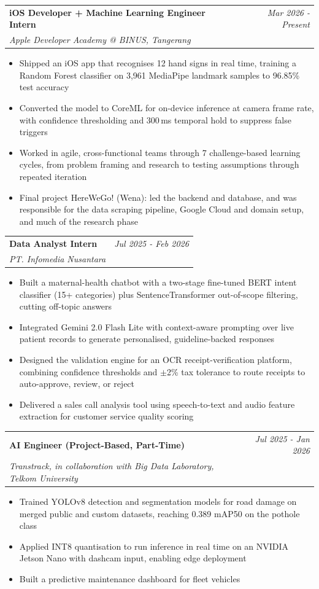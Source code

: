 \documentclass[a4paper,11pt]{article}
\makeatletter
\newcommand{\resumeSubheading}[4]{
\vspace{0.5mm}\item
    \begin{tabular*}{0.98\textwidth}[t]{l@{\extracolsep{\fill}}r}
        \textbf{#1} & \textit{\footnotesize{#4}} \\
        \textit{\footnotesize{#3}} &  \footnotesize{#2}\\
    \end{tabular*}
    \vspace{-2.4mm}
}
\newcommand{\resumeItemListStart}{\begin{justify}\begin{itemize}[leftmargin=3ex, rightmargin=2ex, noitemsep,labelsep=1.2mm,itemsep=0mm]\small}
\newcommand{\resumeItemListEnd}{\end{itemize}\end{justify}\vspace{-2mm}}
\makeatother
\begin{document}
    \resumeSubheading
      {iOS Developer + Machine Learning Engineer Intern}{}
      {Apple Developer Academy @ BINUS, Tangerang}{Mar 2026 - Present}
      \vspace{-2.0mm}
      \resumeItemListStart
        \item {Shipped an iOS app that recognises 12 hand signs in real time, training a Random Forest classifier on 3,961 MediaPipe landmark samples to 96.85\% test accuracy}
        \item {Converted the model to CoreML for on-device inference at camera frame rate, with confidence thresholding and 300\,ms temporal hold to suppress false triggers}
        \item {Worked in agile, cross-functional teams through 7 challenge-based learning cycles, from problem framing and research to testing assumptions through repeated iteration}
        \item {Final project HereWeGo! (Wena): led the backend and database, and was responsible for the data scraping pipeline, Google Cloud and domain setup, and much of the research phase}
      \resumeItemListEnd
      \vspace{-3.0mm}

    \resumeSubheading
      {Data Analyst Intern}{}
      {PT. Infomedia Nusantara}{Jul 2025 - Feb 2026}
      \vspace{-2.0mm}
      \resumeItemListStart
        \item {Built a maternal-health chatbot with a two-stage fine-tuned BERT intent classifier (15+ categories) plus SentenceTransformer out-of-scope filtering, cutting off-topic answers}
        \item {Integrated Gemini 2.0 Flash Lite with context-aware prompting over live patient records to generate personalised, guideline-backed responses}
        \item {Designed the validation engine for an OCR receipt-verification platform, combining confidence thresholds and $\pm$2\% tax tolerance to route receipts to auto-approve, review, or reject}
        \item {Delivered a sales call analysis tool using speech-to-text and audio feature extraction for customer service quality scoring}
      \resumeItemListEnd
      \vspace{-3.0mm}

    \resumeSubheading
      {AI Engineer (Project-Based, Part-Time)}{}
      {Transtrack, in collaboration with Big Data Laboratory, Telkom University}{Jul 2025 - Jan 2026}
      \vspace{-2.0mm}
      \resumeItemListStart
        \item {Trained YOLOv8 detection and segmentation models for road damage on merged public and custom datasets, reaching 0.389 mAP50 on the pothole class}
        \item {Applied INT8 quantisation to run inference in real time on an NVIDIA Jetson Nano with dashcam input, enabling edge deployment}
        \item {Built a predictive maintenance dashboard for fleet vehicles}
      \resumeItemListEnd
      \vspace{-3.0mm}
\end{document}
